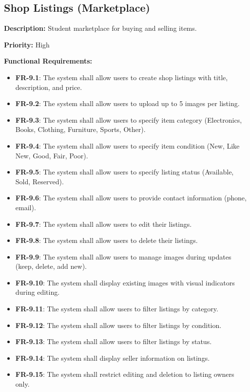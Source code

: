 \documentclass[12pt,a4paper]{article}
\begin{document}
\subsection{Shop Listings (Marketplace)}
\textbf{Description:} Student marketplace for buying and selling items.

\textbf{Priority:} High

\textbf{Functional Requirements:}

\begin{itemize}
    \item \textbf{FR-9.1}: The system shall allow users to create shop listings with title, description, and price.
    \item \textbf{FR-9.2}: The system shall allow users to upload up to 5 images per listing.
    \item \textbf{FR-9.3}: The system shall allow users to specify item category (Electronics, Books, Clothing, Furniture, Sports, Other).
    \item \textbf{FR-9.4}: The system shall allow users to specify item condition (New, Like New, Good, Fair, Poor).
    \item \textbf{FR-9.5}: The system shall allow users to specify listing status (Available, Sold, Reserved).
    \item \textbf{FR-9.6}: The system shall allow users to provide contact information (phone, email).
    \item \textbf{FR-9.7}: The system shall allow users to edit their listings.
    \item \textbf{FR-9.8}: The system shall allow users to delete their listings.
    \item \textbf{FR-9.9}: The system shall allow users to manage images during updates (keep, delete, add new).
    \item \textbf{FR-9.10}: The system shall display existing images with visual indicators during editing.
    \item \textbf{FR-9.11}: The system shall allow users to filter listings by category.
    \item \textbf{FR-9.12}: The system shall allow users to filter listings by condition.
    \item \textbf{FR-9.13}: The system shall allow users to filter listings by status.
    \item \textbf{FR-9.14}: The system shall display seller information on listings.
    \item \textbf{FR-9.15}: The system shall restrict editing and deletion to listing owners only.
\end{itemize}
\end{document}
